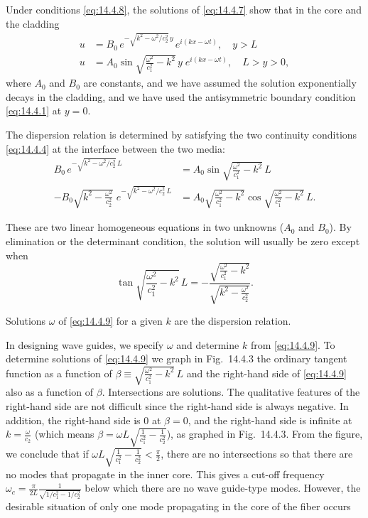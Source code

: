 Under conditions \eqref{eq:14.4.8}, the solutions of \eqref{eq:14.4.7} show that in the core and the cladding
\begin{align*}
u &= B_0\, e^{-\sqrt{k^2 - \omega^2/c_2^2}\,y}\, e^{i(kx - \omega t)}, \quad y > L \\
u &= A_0\sin\sqrt{\frac{\omega^2}{c_1^2} - k^2}\,y\; e^{i(kx - \omega t)}, \quad L > y > 0,
\end{align*}
where $A_0$ and $B_0$ are constants, and we have assumed the solution exponentially decays in the cladding, and we have used the antisymmetric boundary condition \eqref{eq:14.4.1} at $y = 0$.

The dispersion relation is determined by satisfying the two continuity conditions \eqref{eq:14.4.4} at the interface between the two media:
\begin{align*}
B_0\,e^{-\sqrt{k^2 - \omega^2/c_2^2}\,L} &= A_0\sin\sqrt{\frac{\omega^2}{c_1^2} - k^2}\,L \\[6pt]
-B_0\sqrt{k^2 - \frac{\omega^2}{c_2^2}}\;e^{-\sqrt{k^2 - \omega^2/c_2^2}\,L} &= A_0\sqrt{\frac{\omega^2}{c_1^2} - k^2}\cos\sqrt{\frac{\omega^2}{c_1^2} - k^2}\,L.
\end{align*}

These are two linear homogeneous equations in two unknowns ($A_0$ and $B_0$).  By elimination or the determinant condition, the solution will usually be zero except when
\begin{equation}
\label{eq:14.4.9}
\tan\sqrt{\frac{\omega^2}{c_1^2} - k^2}\,L = -\frac{\sqrt{\frac{\omega^2}{c_1^2} - k^2}}{\sqrt{k^2 - \frac{\omega^2}{c_2^2}}}.
\end{equation}

Solutions $\omega$ of \eqref{eq:14.4.9} for a given $k$ are the dispersion relation.

In designing wave guides, we specify $\omega$ and determine $k$ from \eqref{eq:14.4.9}.  To determine solutions of \eqref{eq:14.4.9} we graph in Fig.~14.4.3 the ordinary tangent function as a function of $\beta \equiv \sqrt{\frac{\omega^2}{c_1^2} - k^2}\,L$ and the right-hand side of \eqref{eq:14.4.9} also as a function of $\beta$.  Intersections are solutions.  The qualitative features of the right-hand side are not difficult since the right-hand side is always negative.  In addition, the right-hand side is $0$ at $\beta = 0$, and the right-hand side is infinite at $k = \frac{\omega}{c_2}$ (which means $\beta = \omega L\sqrt{\frac{1}{c_1^2} - \frac{1}{c_2^2}}$), as graphed in Fig.~14.4.3.  From the figure, we conclude that if $\omega L\sqrt{\frac{1}{c_1^2} - \frac{1}{c_2^2}} < \frac{\pi}{2}$, there are no intersections so that there are no modes that propagate in the inner core.  This gives a cut-off frequency $\omega_c = \frac{\pi}{2L}\frac{1}{\sqrt{1/c_1^2 - 1/c_2^2}}$ below which there are no wave guide-type modes.  However, the desirable situation of only one mode propagating in the core of the fiber occurs

